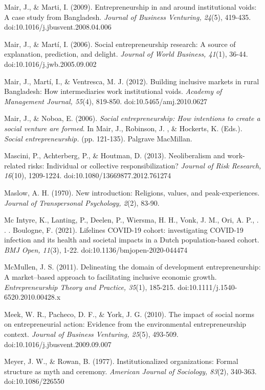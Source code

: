 \documentclass{article}
\begin{document}
Mair, J., \& Marti, I. (2009). Entrepreneurship in and around institutional voids: A case study from Bangladesh. \emph{Journal of Business Venturing, 24}(5), 419-435. doi:10.1016/j.jbusvent.2008.04.006

Mair, J., \& Martí, I. (2006). Social entrepreneurship research: A source of explanation, prediction, and delight. \emph{Journal of World Business, 41}(1), 36-44. doi:10.1016/j.jwb.2005.09.002

Mair, J., Martí, I., \& Ventresca, M. J. (2012). Building inclusive markets in rural Bangladesh: How intermediaries work institutional voids. \emph{Academy of Management Journal, 55}(4), 819-850. doi:10.5465/amj.2010.0627

Mair, J., \& Noboa, E. (2006). \emph{Social entrepreneurship: How intentions to create a social venture are formed}. In Mair, J., Robinson, J. , \& Hockerts, K. (Eds.). \emph{Social entrepreneurship.} (pp. 121-135). Palgrave MacMillan.

Mascini, P., Achterberg, P., \& Houtman, D. (2013). Neoliberalism and work-related risks: Individual or collective responsibilization? \emph{Journal of Risk Research, 16}(10), 1209-1224. doi:10.1080/13669877.2012.761274

Maslow, A. H. (1970). New introduction: Religions, values, and peak-experiences. \emph{Journal of Transpersonal Psychology, 2}(2), 83-90. 

Mc Intyre, K., Lanting, P., Deelen, P., Wiersma, H. H., Vonk, J. M., Ori, A. P., . . . Boulogne, F. (2021). Lifelines COVID-19 cohort: investigating COVID-19 infection and its health and societal impacts in a Dutch population-based cohort. \emph{BMJ Open, 11}(3), 1-22. doi:10.1136/bmjopen-2020-044474

McMullen, J. S. (2011). Delineating the domain of development entrepreneurship: A market--based approach to facilitating inclusive economic growth. \emph{Entrepreneurship Theory and Practice, 35}(1), 185-215. doi:10.1111/j.1540-6520.2010.00428.x

Meek, W. R., Pacheco, D. F., \& York, J. G. (2010). The impact of social norms on entrepreneurial action: Evidence from the environmental entrepreneurship context. \emph{Journal of Business Venturing, 25}(5), 493-509. doi:10.1016/j.jbusvent.2009.09.007

Meyer, J. W., \& Rowan, B. (1977). Institutionalized organizations: Formal structure as myth and ceremony. \emph{American Journal of Sociology, 83}(2), 340-363. doi:10.1086/226550
\end{document}
